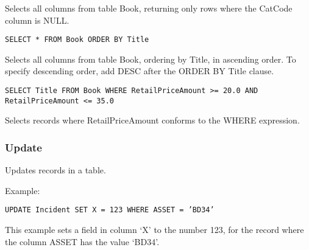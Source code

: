 Selects all columns from table Book, returning only rows where the CatCode column
is NULL.

{\tt SELECT * FROM Book ORDER BY Title}

Selects all columns from table Book, ordering by Title, in ascending order. To specify
descending order, add DESC after the ORDER BY Title clause.

{\tt SELECT Title FROM Book WHERE RetailPriceAmount >= 20.0 AND RetailPriceAmount <= 35.0}

Selects records where RetailPriceAmount conforms to the WHERE expression.

\subsubsection{Update}

Updates records in a table.

Example:

{\tt UPDATE Incident SET X = 123 WHERE ASSET = 'BD34'}

This example sets a field in column `X' to the number 123, for the record
where the column ASSET has the value `BD34'.


